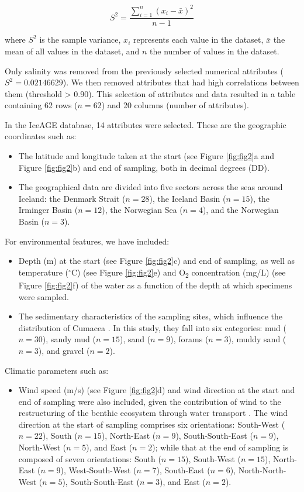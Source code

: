 \begin{equation}\label{variance}
    S^2 = \frac{\sum_{i=1}^{n} (x_i - \bar{x})^2}{n-1}
\end{equation}

where $S^2$ is the sample variance, $x_i$ represents each value in the dataset, $\bar{x}$ the mean of all values in the dataset, and $n$ the number of values in the dataset.

Only salinity was removed from the previously selected numerical attributes ($S^2 = 0.02146629$). We then removed attributes that had high correlations between them (threshold > 0.90). This selection of attributes and data resulted in a table containing 62 rows ($n=62$) and 20 columns (number of attributes). 

In the IceAGE database, 14 attributes were selected. These are the geographic coordinates such as: 

\begin{itemize}
\item The latitude and longitude taken at the start (see Figure \ref{fig:fig2}a and Figure \ref{fig:fig2}b) and end of sampling, both in decimal degrees (DD).
\item The geographical data are divided into five sectors across the seas around Iceland: the Denmark Strait ($n=28$), the Iceland Basin ($n=15$), the Irminger Basin ($n=12$), the Norwegian Sea ($n=4$), and the Norwegian Basin ($n=3$). 
\end{itemize}

For environmental features, we have included:
\begin{itemize}
\item Depth (m) at the start (see Figure \ref{fig:fig2}c) and end of sampling, as well as temperature ($^\circ$C) (see Figure \ref{fig:fig2}e) and O\textsubscript{2} concentration (mg/L) (see Figure \ref{fig:fig2}f) of the water as a function of the depth at which specimens were sampled. 
\item The sedimentary characteristics of the sampling sites, which influence the distribution of Cumacea \citep{uhlir_adding_2021}. In this study, they fall into six categories: mud ($n=30$), sandy mud ($n=15$), sand ($n=9$), forams ($n=3$), muddy sand ($n=3$), and gravel ($n=2$).
\end{itemize}

Climatic parameters such as: 
\begin{itemize}
\item Wind speed (m/s) (see Figure \ref{fig:fig2}d) and wind direction at the start and end of sampling were also included, given the contribution of wind to the restructuring of the benthic ecosystem through water transport \citep{waga_recent_2020,saeedi_environmental_2022}. The wind direction at the start of sampling comprises six orientations: South-West ($n=22$), South ($n=15$), North-East ($n=9$), South-South-East ($n=9$), North-West ($n=5$), and East ($n=2$); while that at the end of sampling is composed of seven orientations: South ($n=15$), South-West ($n=15$), North-East ($n=9$), West-South-West ($n=7$), South-East ($n=6$), North-North-West ($n=5$), South-South-East ($n=3$), and East ($n=2$). 
\end{itemize}

